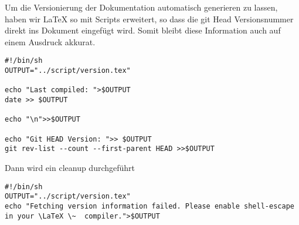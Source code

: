 Um die  Versionierung der Dokumentation automatisch generieren zu lassen, haben wir LaTeX so mit Scripts erweitert, so dass die git Head Versionsnummer
direkt ins Dokument eingefügt wird. Somit bleibt diese Information auch auf einem Ausdruck akkurat.



\begin{lstlisting}
#!/bin/sh
OUTPUT="../script/version.tex"

echo "Last compiled: ">$OUTPUT
date >> $OUTPUT

echo "\n">>$OUTPUT

echo "Git HEAD Version: ">> $OUTPUT
git rev-list --count --first-parent HEAD >>$OUTPUT
\end{lstlisting}
Dann wird ein cleanup durchgeführt
\begin{lstlisting}
#!/bin/sh
OUTPUT="../script/version.tex"
echo "Fetching version information failed. Please enable shell-escape in your \LaTeX \~  compiler.">$OUTPUT
\end{lstlisting}